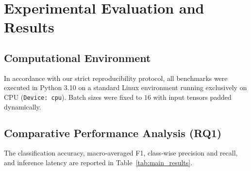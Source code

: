 \documentclass[11pt,a4paper]{article}
\begin{document}
\section{Experimental Evaluation and Results}
\label{sec:experiments}

\subsection{Computational Environment}
In accordance with our strict reproducibility protocol, all benchmarks were executed in Python 3.10 on a standard Linux environment running exclusively on CPU (\texttt{Device: cpu}). Batch sizes were fixed to $16$ with input tensors padded dynamically.

\begin{table}[t]
\centering
\small
{}
\caption{Empirical performance and computational latency comparison on scientific claim--evidence pairs ($N = 100$, CPU execution, Seed $S=42$). \texttt{NEI} denotes \texttt{NO\_EVIDENCE}; \texttt{SUP} denotes \texttt{SUPPORT}. Macro-F1 incorporates all three standardized classes.}
\label{tab:main_results}
\end{table}

\subsection{Comparative Performance Analysis (RQ1)}
The classification accuracy, macro-averaged F1, class-wise precision and recall, and inference latency are reported in Table~\ref{tab:main_results}.
\end{document}
